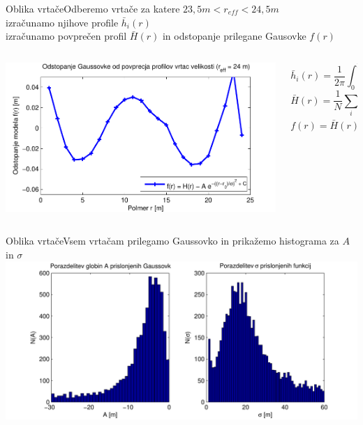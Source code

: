 \documentclass{beamer}
\begin{document}
\begin{frame}{Oblika vrtače}{Odberemo vrtače za katere $23,5m < r_{eff} < 24,5m$ \\ izračunamo njihove profile $\bar h_i(r)$ \\ izračunamo povprečen profil $\bar H(r)$ in odstopanje prilegane Gausovke $f(r)$}
\begin{columns}
  \begin{column}{0.7\textwidth}
    \includegraphics[width=1.05\textwidth]{slike/menisija-profil-21-fit}
  \end{column}
  \begin{column}{0.45\textwidth}
    \footnotesize
    \begin{equation} \bar h_i(r) = \frac{1}{2 \pi} \int_0^{2\pi} h_i(r,\phi) \mathrm{d}\phi \end{equation}
    \begin{equation} \bar H(r) = \frac{1}{N} \sum_{i} \bar h_i(r) \end{equation}
    \begin{equation} f(r) = \bar{H}(r) - A \cdot e^{-\frac{(r-r_0)^2}{\sigma^2}} + C \end{equation}
  \end{column}
\end{columns}
\end{frame}

\begin{frame}{Oblika vrtače}{Vsem vrtačam prilegamo Gaussovko in prikažemo histograma za $A$ in $\sigma$}
    \hspace*{-0.1\textwidth}\includegraphics[width=1.2\textwidth]{slike/menisija-visine-in-sigme-hist}
\end{frame}
\end{document}
